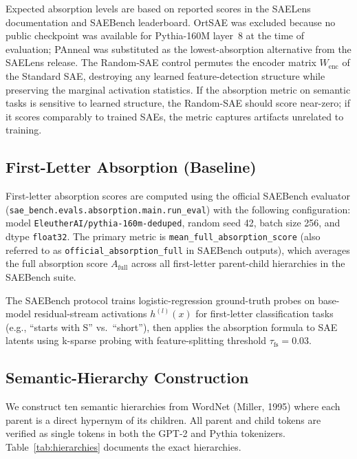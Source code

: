 \documentclass{article}
\begin{document}
Expected absorption levels are based on reported scores in the SAELens documentation and SAEBench leaderboard. OrtSAE was excluded because no public checkpoint was available for Pythia-160M layer~8 at the time of evaluation; PAnneal was substituted as the lowest-absorption alternative from the SAELens release. The Random-SAE control permutes the encoder matrix $W_{\text{enc}}$ of the Standard SAE, destroying any learned feature-detection structure while preserving the marginal activation statistics. If the absorption metric on semantic tasks is sensitive to learned structure, the Random-SAE should score near-zero; if it scores comparably to trained SAEs, the metric captures artifacts unrelated to training.

\subsection{First-Letter Absorption (Baseline)}

First-letter absorption scores are computed using the official SAEBench evaluator (\texttt{sae\_bench.evals.absorption.main.run\_eval}) with the following configuration: model \texttt{EleutherAI/pythia-160m-deduped}, random seed 42, batch size 256, and dtype \texttt{float32}. The primary metric is \texttt{mean\_full\_absorption\_score} (also referred to as \texttt{official\_absorption\_full} in SAEBench outputs), which averages the full absorption score $A_{\text{full}}$ across all first-letter parent-child hierarchies in the SAEBench suite.

The SAEBench protocol trains logistic-regression ground-truth probes on base-model residual-stream activations $h^{(l)}(x)$ for first-letter classification tasks (e.g., ``starts with S'' vs.~``short''), then applies the absorption formula to SAE latents using k-sparse probing with feature-splitting threshold $\tau_{\text{fs}} = 0.03$.

\subsection{Semantic-Hierarchy Construction}

We construct ten semantic hierarchies from WordNet (Miller, 1995) where each parent is a direct hypernym of its children. All parent and child tokens are verified as single tokens in both the GPT-2 and Pythia tokenizers. Table~\ref{tab:hierarchies} documents the exact hierarchies.
\end{document}
